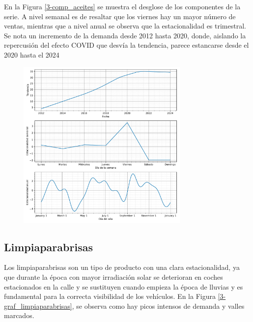 En la Figura \ref*{3-comp_aceites} se muestra el desglose de los componentes de la serie. A nivel semanal es de resaltar que los viernes hay un mayor número de ventas, mientras que a nivel anual se observa que la estacionalidad es trimestral. Se nota un incremento de la demanda desde 2012 hasta 2020, donde, aislando la repercusión del efecto COVID que desvía la tendencia, parece estancarse desde el 2020 hasta el 2024

\begin{figure}[H]
	{\includegraphics[width=0.75\textwidth]{imagenes/comps_aceites.pdf}}
\end{figure}

\subsection{Limpiaparabrisas}

Los limpiaparabrisas son un tipo de producto con una clara estacionalidad, ya que durante la época con mayor irradiación solar se deterioran en coches estacionados en la calle y se sustituyen cuando empieza la época de lluvias y es fundamental para la correcta visibilidad de los vehículos. En la Figura \ref*{3-graf_limpiaparabrisas}, se observa como hay picos intensos de demanda y valles marcados.

